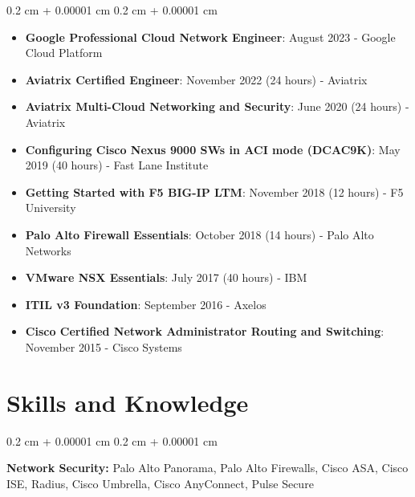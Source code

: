 \documentclass[10pt, a4paper]{article}
\newenvironment{highlightsforbulletentries}{
    \begin{itemize}[
        topsep=0.10 cm,
        parsep=0.10 cm,
        partopsep=0pt,
        itemsep=0pt,
        leftmargin=10pt
    ]
}{
    \end{itemize}
} %
\newenvironment{onecolentry}{
    \begin{adjustwidth}{
        0.2 cm + 0.00001 cm
    }{
        0.2 cm + 0.00001 cm
    }
}{
    \end{adjustwidth}
} %
\begin{document}
    \begin{onecolentry}
        \begin{highlightsforbulletentries}


        \item \textbf{Google Professional Cloud Network Engineer}: August 2023 - Google Cloud Platform

        \item \textbf{Aviatrix Certified Engineer}: November 2022 (24 hours) - Aviatrix

        \item \textbf{Aviatrix Multi-Cloud Networking and Security}: June 2020 (24 hours) - Aviatrix

        \item \textbf{Configuring Cisco Nexus 9000 SWs in ACI mode (DCAC9K)}: May 2019 (40 hours) - Fast Lane Institute

        \item \textbf{Getting Started with F5 BIG-IP LTM}: November 2018 (12 hours) - F5 University

        \item \textbf{Palo Alto Firewall Essentials}: October 2018 (14 hours) - Palo Alto Networks

        \item \textbf{VMware NSX Essentials}: July 2017 (40 hours) - IBM

        \item \textbf{ITIL v3 Foundation}: September 2016 - Axelos

        \item \textbf{Cisco Certified Network Administrator Routing and Switching}: November 2015 - Cisco Systems


        \end{highlightsforbulletentries}
    \end{onecolentry}

    \section{Skills and Knowledge}



        
        \begin{onecolentry}
            \textbf{Network Security:} Palo Alto Panorama, Palo Alto Firewalls, Cisco ASA, Cisco ISE, Radius, Cisco Umbrella, Cisco AnyConnect, Pulse Secure
        \end{onecolentry}

        \vspace{0.2 cm}
\end{document}
